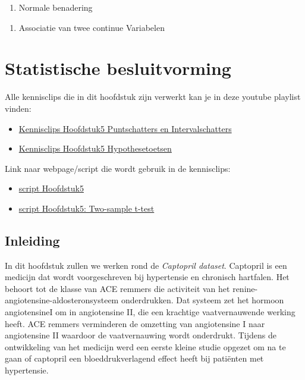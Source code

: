 \documentclass[
  12pt,dutch,coursenotes]{book}
\providecommand{\tightlist}{%
  \setlength{\itemsep}{0pt}\setlength{\parskip}{0pt}}
\begin{document}
\begin{enumerate}
\def\labelenumi{\arabic{enumi}.}
\setcounter{enumi}{2}
\tightlist
\item
  Normale benadering
\end{enumerate}

\begin{enumerate}
\def\labelenumi{\arabic{enumi}.}
\setcounter{enumi}{3}
\tightlist
\item
  Associatie van twee continue Variabelen
\end{enumerate}

\hypertarget{chap-besluit}{%
\chapter{Statistische besluitvorming}\label{chap-besluit}}

Alle kennisclips die in dit hoofdstuk zijn verwerkt kan je in deze youtube playlist vinden:

\begin{itemize}
\item
  \href{https://www.youtube.com/playlist?list=PLZH1hP8_LbJKyD9Jw5cqd-btYs11f9tkz}{Kennisclips Hoofdstuk5 Puntschatters en Intervalschatters}
\item
  \href{https://www.youtube.com/playlist?list=PLZH1hP8_LbJKEtDy2errIWf8hLJODw-jK}{Kennisclips Hoofdstuk5 Hypothesetoetsen}
\end{itemize}

Link naar webpage/script die wordt gebruik in de kennisclips:

\begin{itemize}
\item
  \href{https://statomics.github.io/sbc21/rmd/05-statisticalInference.html}{script Hoofdstuk5}
\item
  \href{https://statomics.github.io/sbc21/rmd/05-statisticalInference-twosampleT.html}{script Hoofdstuk5: Two-sample t-test}
\end{itemize}

\hypertarget{inleiding-4}{%
\section{Inleiding}\label{inleiding-4}}

In dit hoofdstuk zullen we werken rond de \emph{Captopril dataset}.
Captopril is een medicijn dat wordt voorgeschreven bij hypertensie en chronisch hartfalen. Het behoort tot de klasse van ACE remmers die activiteit van het renine-angiotensine-aldosteronsysteem onderdrukken. Dat systeem zet het hormoon angiotensineI om in angiotensine II, die een krachtige vaatvernauwende werking heeft. ACE remmers verminderen de omzetting van angiotensine I naar angiotensine II waardoor de vaatvernauwing wordt onderdrukt. Tijdens de ontwikkeling van het medicijn werd een eerste kleine studie opgezet om na te gaan of captopril een bloeddrukverlagend effect heeft bij patiënten met hypertensie.
\end{document}
